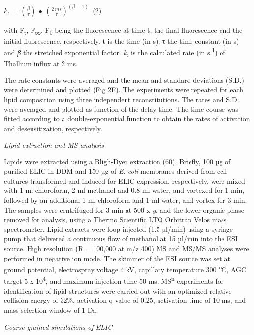 \(k_{t} = \ \left( \frac{\beta}{\tau} \right)\  \bullet \ \left( \frac{2\ ms}{\tau} \right)^{\left( \beta\  - 1 \right)}\ \)
(2)

with F\textsubscript{t}, F\textsubscript{∞}, F\textsubscript{0} being
the fluorescence at time t, the final fluorescence and the initial
fluorescence, respectively. t is the time (in s), τ the time constant
(in s) and \emph{β} the stretched exponential factor.
\emph{k}\textsubscript{t} is the calculated rate (in
s\textsuperscript{-1}) of Thallium influx at 2 ms.

The rate constants were averaged and the mean and standard deviations
(S.D.) were determined and plotted (Fig 2F). The experiments were
repeated for each lipid composition using three independent
reconstitutions. The rates and S.D. were averaged and plotted as
function of the delay time. The time course was fitted according to a
double-exponential function to obtain the rates of activation and
desensitization, respectively.

\emph{Lipid extraction and MS analysis}

Lipids were extracted using a Bligh-Dyer extraction (60). Briefly, 100
µg of purified ELIC in DDM and 150 µg of \emph{E. coli} membranes
derived from cell cultures transformed and induced for ELIC expression,
respectively, were mixed with 1 ml chloroform, 2 ml methanol and 0.8 ml
water, and vortexed for 1 min, followed by an additional 1 ml chloroform
and 1 ml water, and vortex for 3 min. The samples were centrifuged for 3
min at 500 x \emph{g}, and the lower organic phase removed for analysis,
using a Thermo Scientific LTQ Orbitrap Velos mass spectrometer. Lipid
extracts were loop injected (1.5 µl/min) using a syringe pump that
delivered a continuous flow of methanol at 15 µl/min into the ESI
source. High resolution (R = 100,000 at m/z 400) MS and MS/MS analyses
were performed in negative ion mode. The skimmer of the ESI source was
set at ground potential, electrospray voltage 4 kV, capillary
temperature 300 \textsuperscript{o}C, AGC target 5 x
10\textsuperscript{4}, and maximum injection time 50 ms.
MS\textsuperscript{n} experiments for identification of lipid structures
were carried out with an optimized relative collision energy of 32\%,
activation q value of 0.25, activation time of 10 ms, and mass selection
window of 1 Da.

\emph{Coarse-grained simulations of ELIC}

